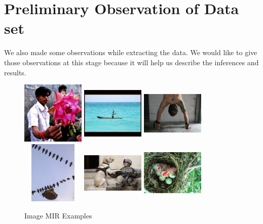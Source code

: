 \section{Preliminary Observation of Data set}
We also made some observations while extracting the data. We would like to 
give those observations at this stage because it will help us 
describe the inferences and results.
\begin{center}
\begin{figure}
\centering
\includegraphics[width=3cm, height=3cm]{./Pictures/MIR/1.jpg}
\includegraphics[width=3cm, height=3cm]{./Pictures/MIR/2.jpg}
\includegraphics[width=3cm, height=3cm]{./Pictures/MIR/3.jpg} \\
\includegraphics[width=3cm, height=3cm]{./Pictures/MIR/4.jpg}
\includegraphics[width=3cm, height=3cm]{./Pictures/MIR/5.jpg}
\includegraphics[width=3cm, height=3cm]{./Pictures/MIR/6.jpg}
\caption{Image MIR Examples}
\label{fig:Image MIR Examples}
\end{figure}
\end{center}

